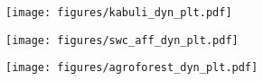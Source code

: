 \documentclass[11pt]{beamer}
\begin{document}
\begin{frame}
\label{kabulidynplt}
\texttt{[image: figures/kabuli\_dyn\_plt.pdf]}
\hyperlink{frstpg}{}
\end{frame}

\begin{frame}
\label{swcaffdynplt}
\texttt{[image: figures/swc\_aff\_dyn\_plt.pdf]}
\hyperlink{frstpg}{}
\end{frame}

\begin{frame}
\label{agroforestdynplt}
\texttt{[image: figures/agroforest\_dyn\_plt.pdf]}
\hyperlink{frstpg}{}
\end{frame}
\end{document}
